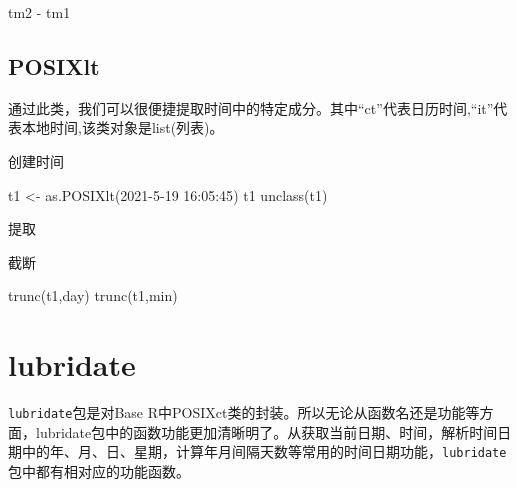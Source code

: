 \documentclass[
]{book}
\newenvironment{Shaded}{\begin{snugshade}}{\end{snugshade}}
\newcommand{\FunctionTok}[1]{\textcolor[rgb]{0.00,0.00,0.00}{#1}}
\newcommand{\NormalTok}[1]{#1}
\newcommand{\OtherTok}[1]{\textcolor[rgb]{0.56,0.35,0.01}{#1}}
\newcommand{\SpecialCharTok}[1]{\textcolor[rgb]{0.00,0.00,0.00}{#1}}
\newcommand{\StringTok}[1]{\textcolor[rgb]{0.31,0.60,0.02}{#1}}
\begin{document}
\begin{Shaded}
\begin{Highlighting}[]
\NormalTok{tm2 }\SpecialCharTok{{-}}\NormalTok{ tm1}
\end{Highlighting}
\end{Shaded}

\hypertarget{datetime:base-R-POSIXlt}{%
\subsection{POSIXlt}\label{datetime:base-R-POSIXlt}}

通过此类，我们可以很便捷提取时间中的特定成分。其中``ct''代表日历时间,``it''代表本地时间,该类对象是list(列表)。

创建时间

\begin{Shaded}
\begin{Highlighting}[]
\NormalTok{t1 }\OtherTok{\textless{}{-}} \FunctionTok{as.POSIXlt}\NormalTok{(}\StringTok{\textquotesingle{}2021{-}5{-}19 16:05:45\textquotesingle{}}\NormalTok{)}
\NormalTok{t1}
\FunctionTok{unclass}\NormalTok{(t1)}
\end{Highlighting}
\end{Shaded}

提取

\begin{Shaded}
\end{Shaded}

截断

\begin{Shaded}
\begin{Highlighting}[]
\FunctionTok{trunc}\NormalTok{(t1,}\StringTok{\textquotesingle{}day\textquotesingle{}}\NormalTok{)}
\FunctionTok{trunc}\NormalTok{(t1,}\StringTok{\textquotesingle{}min\textquotesingle{}}\NormalTok{)}
\end{Highlighting}
\end{Shaded}

\hypertarget{lubridate}{%
\section{lubridate}\label{lubridate}}

\texttt{lubridate}包是对Base R中POSIXct类的封装。所以无论从函数名还是功能等方面，lubridate包中的函数功能更加清晰明了。从获取当前日期、时间，解析时间日期中的年、月、日、星期，计算年月间隔天数等常用的时间日期功能，\texttt{lubridate}包中都有相对应的功能函数。
\end{document}
